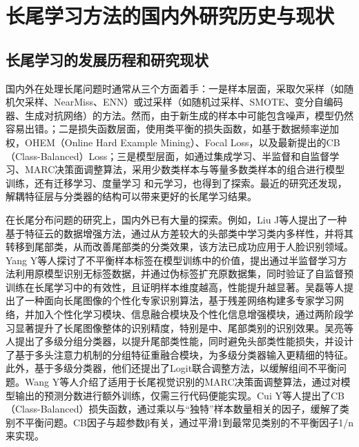 \documentclass[master]{thesis-uestc}
\begin{document}
\section{长尾学习方法的国内外研究历史与现状}
\subsection{长尾学习的发展历程和研究现状}
国内外在处理长尾问题时通常从三个方面着手：一是样本层面，采取欠采样（如随机欠采样、NearMiss、ENN）或过采样（如随机过采样、SMOTE、变分自编码器、生成对抗网络）的方法。然而，由于新生成的样本中可能包含噪声，模型仍然容易出错。；二是损失函数层面，使用类平衡的损失函数，如基于数据频率逆加权，OHEM（Online Hard Example Mining）、Focal Loss，以及最新提出的CB（Class-Balanced）Loss；三是模型层面，如通过集成学习、半监督和自监督学习、MARC决策面调整算法，采用少数类样本与等量多数类样本的组合进行模型训练，还有迁移学习、度量学习 和元学习，也得到了探索。最近的研究还发现，解耦特征层与分类器的结构可以带来更好的长尾学习结果。

在长尾分布问题的研究上，国内外已有大量的探索。例如，Liu J等人提出了一种基于特征云的数据增强方法，通过从方差较大的头部类中学习类内多样性，并将其转移到尾部类，从而改善尾部类的分类效果，该方法已成功应用于人脸识别领域。Yang Y等人探讨了不平衡样本标签在模型训练中的价值，提出通过半监督学习方法利用原模型识别无标签数据，并通过伪标签扩充原数据集，同时验证了自监督预训练在长尾学习中的有效性，且证明样本维度越高，性能提升越显著。吴磊等人提出了一种面向长尾图像的个性化专家识别算法，基于残差网络构建多专家学习网络，并加入个性化学习模块、信息融合模块及个性化信息增强模块，通过两阶段学习显著提升了长尾图像整体的识别精度，特别是中、尾部类别的识别效果。吴亮等人提出了多级分组分类器，以提升尾部类性能，同时避免头部类性能损失，并设计了基于多头注意力机制的分组特征重融合模块，为多级分类器输入更精细的特征。此外，基于多级分类器，他们还提出了Logit联合调整方法，以缓解组间不平衡问题。Wang Y等人介绍了适用于长尾视觉识别的MARC决策面调整算法，通过对模型输出的预测分数进行额外训练，仅需三行代码便能实现。Cui Y等人提出了CB（Class-Balanced）损失函数，通过乘以与“独特”样本数量相关的因子，缓解了类别不平衡问题。CB因子与超参数β有关，通过平滑1到最常见类别的不平衡因子1/n来实现。
\end{document}
